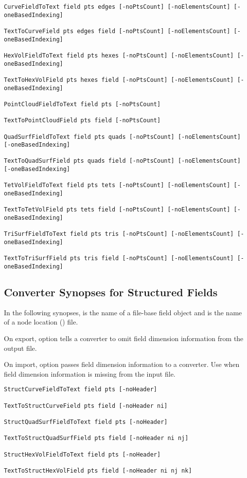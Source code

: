 \begin{verbatim}
CurveFieldToText field pts edges [-noPtsCount] [-noElementsCount] [-oneBasedIndexing]

TextToCurveField pts edges field [-noPtsCount] [-noElementsCount] [-oneBasedIndexing]

HexVolFieldToText field pts hexes [-noPtsCount] [-noElementsCount] [-oneBasedIndexing]

TextToHexVolField pts hexes field [-noPtsCount] [-noElementsCount] [-oneBasedIndexing]

PointCloudFieldToText field pts [-noPtsCount]

TextToPointCloudField pts field [-noPtsCount]

QuadSurfFieldToText field pts quads [-noPtsCount] [-noElementsCount] [-oneBasedIndexing]

TextToQuadSurfField pts quads field [-noPtsCount] [-noElementsCount] [-oneBasedIndexing]

TetVolFieldToText field pts tets [-noPtsCount] [-noElementsCount] [-oneBasedIndexing]

TextToTetVolField pts tets field [-noPtsCount] [-noElementsCount] [-oneBasedIndexing]

TriSurfFieldToText field pts tris [-noPtsCount] [-noElementsCount] [-oneBasedIndexing]

TextToTriSurfField pts tris field [-noPtsCount] [-noElementsCount] [-oneBasedIndexing]
\end{verbatim}


\subsection{Converter Synopses for Structured Fields}
\label{sec:struct_field_synopses}

In the following synopses,  is the name of a \sr{}
file-base field object and  is the name of a node location
() file.

On export, option  tells a converter to omit
field dimension information from the output file.

On import, option  passes field dimension
information to a converter. Use  when field
dimension information is missing from the input file.

\begin{verbatim}
StructCurveFieldToText field pts [-noHeader]

TextToStructCurveField pts field [-noHeader ni]

StructQuadSurfFieldToText field pts [-noHeader]

TextToStructQuadSurfField pts field [-noHeader ni nj]

StructHexVolFieldToText field pts [-noHeader]

TextToStructHexVolField pts field [-noHeader ni nj nk]

\end{verbatim}

